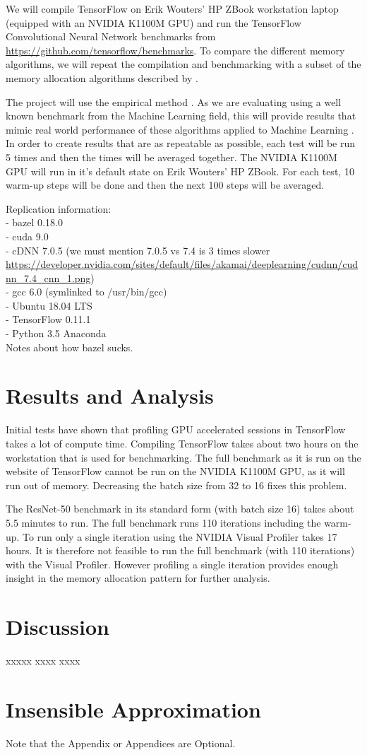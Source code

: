 \documentclass[12pt,twoside]{article}
\begin{document}
We will compile TensorFlow on Erik Wouters' HP ZBook workstation laptop (equipped with an NVIDIA K1100M GPU) and run the TensorFlow Convolutional Neural Network benchmarks from \url{https://github.com/tensorflow/benchmarks}. To compare the different memory algorithms, we will repeat the compilation and benchmarking with a subset of the memory allocation algorithms described by \citeauthor{Vinkler2015} \cite{Vinkler2015}.

The project will use the empirical method \cite{bock2001}. As we are evaluating using a well known benchmark from the Machine Learning field, this will provide results that mimic real world performance of these algorithms applied to Machine Learning \cite{abadi2016}. In order to create results that are as repeatable as possible, each test will be run 5 times and then the times will be averaged together. The NVIDIA K1100M GPU will run in it's default state on Erik Wouters' HP ZBook. For each test, 10 warm-up steps will be done and then the next 100 steps will be averaged. 

Replication information:\\
- bazel 0.18.0\\
- cuda 9.0\\
- cDNN 7.0.5 (we must mention 7.0.5 vs 7.4 is 3 times slower \url{https://developer.nvidia.com/sites/default/files/akamai/deeplearning/cudnn/cudnn_7.4_cnn_1.png})\\
- gcc 6.0 (symlinked to /usr/bin/gcc)\\
- Ubuntu 18.04 LTS\\
- TensorFlow 0.11.1\\
- Python 3.5 Anaconda\\

Notes about how bazel sucks.


\section{Results and Analysis}
\label{sec:results-and-analysis}
Initial tests have shown that profiling GPU accelerated sessions in TensorFlow takes a lot of compute time. Compiling TensorFlow takes about two hours on the workstation that is used for benchmarking. The full benchmark as it is run on the website of TensorFlow cannot be run on the NVIDIA K1100M GPU, as it will run out of memory. Decreasing the batch size from 32 to 16 fixes this problem.

The ResNet-50 benchmark in its standard form (with batch size 16) takes about 5.5 minutes to run. The full benchmark runs 110 iterations including the warm-up. To run only a single iteration using the NVIDIA Visual Profiler takes 17 hours. It is therefore not feasible to run the full benchmark (with 110 iterations) with the Visual Profiler. However profiling a single iteration provides enough insight in the memory allocation pattern for further analysis.

\section{Discussion}
\label{sec:discussion}
xxxxx xxxx xxxx 



\appendix
\section{Insensible Approximation}

Note that the Appendix or Appendices are Optional.
\end{document}
